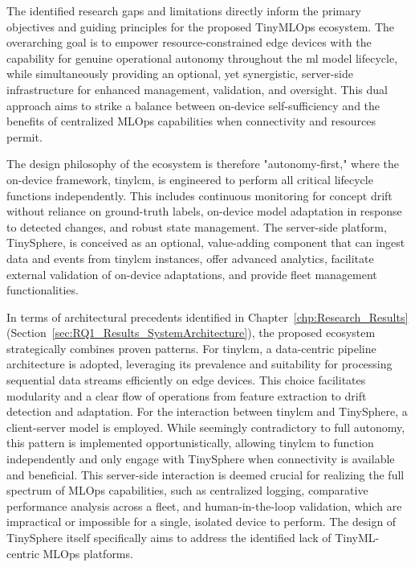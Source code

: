 The identified research gaps and limitations directly inform the primary objectives and guiding principles for the proposed TinyMLOps ecosystem. The overarching goal is to empower resource-constrained edge devices with the capability for genuine operational autonomy throughout the \gls{ml} model lifecycle, while simultaneously providing an optional, yet synergistic, server-side infrastructure for enhanced management, validation, and oversight. This dual approach aims to strike a balance between on-device self-sufficiency and the benefits of centralized MLOps capabilities when connectivity and resources permit.

The design philosophy of the ecosystem is therefore "autonomy-first," where the on-device framework, \gls{tinylcm}, is engineered to perform all critical lifecycle functions independently. This includes continuous monitoring for concept drift without reliance on ground-truth labels, on-device model adaptation in response to detected changes, and robust state management. The server-side platform, TinySphere, is conceived as an optional, value-adding component that can ingest data and events from \gls{tinylcm} instances, offer advanced analytics, facilitate external validation of on-device adaptations, and provide fleet management functionalities.

In terms of architectural precedents identified in Chapter~\ref{chp:Research_Results} (Section~\ref{sec:RQ1_Results_SystemArchitecture}), the proposed ecosystem strategically combines proven patterns. For \gls{tinylcm}, a data-centric pipeline architecture is adopted, leveraging its prevalence and suitability for processing sequential data streams efficiently on edge devices. This choice facilitates modularity and a clear flow of operations from feature extraction to drift detection and adaptation. For the interaction between \gls{tinylcm} and TinySphere, a client-server model is employed. While seemingly contradictory to full autonomy, this pattern is implemented opportunistically, allowing \gls{tinylcm} to function independently and only engage with TinySphere when connectivity is available and beneficial. This server-side interaction is deemed crucial for realizing the full spectrum of MLOps capabilities, such as centralized logging, comparative performance analysis across a fleet, and human-in-the-loop validation, which are impractical or impossible for a single, isolated device to perform. The design of TinySphere itself specifically aims to address the identified lack of TinyML-centric MLOps platforms.


